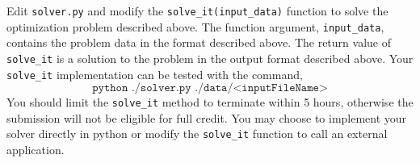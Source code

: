 Edit \texttt{solver.py} and modify the \texttt{solve\_it(input\_data)} function to solve the optimization problem described above.  The function argument, \texttt{input\_data}, contains the problem data in the format described above.  The return value of \texttt{solve\_it} is a solution to the problem in the output format described above.  Your \texttt{solve\_it} implementation can be tested with the command, 
\[ 
\texttt{python ./solver.py ./data/<inputFileName>} 
\] 
You should limit the \texttt{solve\_it} method to terminate within 5 hours, otherwise the submission will not be eligible for full credit.  You may choose to implement your solver directly in python or modify the \texttt{solve\_it} function to call an external application.